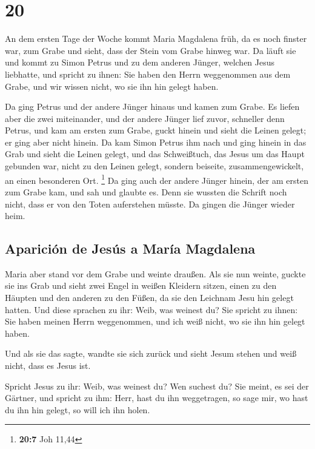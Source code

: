 \hypertarget{section-19}{%
\section{20}\label{section-19}}

 An dem ersten Tage der Woche kommt Maria Magdalena früh,
da es noch finster war, zum Grabe und sieht, dass der Stein vom Grabe
hinweg war.  Da läuft sie und kommt zu Simon Petrus und zu
dem anderen Jünger, welchen Jesus liebhatte, und spricht zu ihnen: Sie
haben den Herrn weggenommen aus dem Grabe, und wir wissen nicht, wo sie
ihn hin gelegt haben.

 Da ging Petrus und der andere Jünger hinaus und kamen zum
Grabe.  Es liefen aber die zwei miteinander, und der
andere Jünger lief zuvor, schneller denn Petrus, und kam am ersten zum
Grabe,  guckt hinein und sieht die Leinen gelegt; er ging
aber nicht hinein.  Da kam Simon Petrus ihm nach und ging
hinein in das Grab und sieht die Leinen gelegt,  und das
Schweißtuch, das Jesus um das Haupt gebunden war, nicht zu den Leinen
gelegt, sondern beiseite, zusammengewickelt, an einen besonderen Ort.
\footnote{\textbf{20:7} Joh 11,44}  Da ging auch der
andere Jünger hinein, der am ersten zum Grabe kam, und sah und glaubte
es.  Denn sie wussten die Schrift noch nicht, dass er von
den Toten auferstehen müsste.  Da gingen die Jünger
wieder heim.

\hypertarget{apariciuxf3n-de-jesuxfas-a-maruxeda-magdalena}{%
\subsection{Aparición de Jesús a María
Magdalena}\label{apariciuxf3n-de-jesuxfas-a-maruxeda-magdalena}}

 Maria aber stand vor dem Grabe und weinte draußen. Als
sie nun weinte, guckte sie ins Grab  und sieht zwei Engel
in weißen Kleidern sitzen, einen zu den Häupten und den anderen zu den
Füßen, da sie den Leichnam Jesu hin gelegt hatten.  Und
diese sprachen zu ihr: Weib, was weinest du? Sie spricht zu ihnen: Sie
haben meinen Herrn weggenommen, und ich weiß nicht, wo sie ihn hin
gelegt haben.

 Und als sie das sagte, wandte sie sich zurück und sieht
Jesum stehen und weiß nicht, dass es Jesus ist.

 Spricht Jesus zu ihr: Weib, was weinest du? Wen suchest
du? Sie meint, es sei der Gärtner, und spricht zu ihm: Herr, hast du ihn
weggetragen, so sage mir, wo hast du ihn hin gelegt, so will ich ihn
holen.

